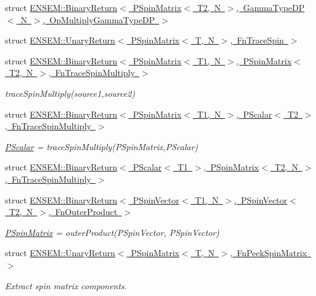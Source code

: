 \begin{DoxyCompactItemize}
\item 
struct \mbox{\hyperlink{structENSEM_1_1BinaryReturn_3_01PSpinMatrix_3_01T2_00_01N_01_4_00_01GammaTypeDP_3_01N_01_4_00_01OpMultiplyGammaTypeDP_01_4}{E\+N\+S\+E\+M\+::\+Binary\+Return$<$ P\+Spin\+Matrix$<$ T2, N $>$, Gamma\+Type\+D\+P$<$ N $>$, Op\+Multiply\+Gamma\+Type\+D\+P $>$}}
\item 
struct \mbox{\hyperlink{structENSEM_1_1UnaryReturn_3_01PSpinMatrix_3_01T_00_01N_01_4_00_01FnTraceSpin_01_4}{E\+N\+S\+E\+M\+::\+Unary\+Return$<$ P\+Spin\+Matrix$<$ T, N $>$, Fn\+Trace\+Spin $>$}}
\item 
struct \mbox{\hyperlink{structENSEM_1_1BinaryReturn_3_01PSpinMatrix_3_01T1_00_01N_01_4_00_01PSpinMatrix_3_01T2_00_01N_01fe1ad0c4fbb2ea3b6d703682cfed6045}{E\+N\+S\+E\+M\+::\+Binary\+Return$<$ P\+Spin\+Matrix$<$ T1, N $>$, P\+Spin\+Matrix$<$ T2, N $>$, Fn\+Trace\+Spin\+Multiply $>$}}
\begin{DoxyCompactList}\small\item\em trace\+Spin\+Multiply(source1,source2) \end{DoxyCompactList}\item 
struct \mbox{\hyperlink{structENSEM_1_1BinaryReturn_3_01PSpinMatrix_3_01T1_00_01N_01_4_00_01PScalar_3_01T2_01_4_00_01FnTraceSpinMultiply_01_4}{E\+N\+S\+E\+M\+::\+Binary\+Return$<$ P\+Spin\+Matrix$<$ T1, N $>$, P\+Scalar$<$ T2 $>$, Fn\+Trace\+Spin\+Multiply $>$}}
\begin{DoxyCompactList}\small\item\em \mbox{\hyperlink{classENSEM_1_1PScalar}{P\+Scalar}} = trace\+Spin\+Multiply(\+P\+Spin\+Matrix,\+P\+Scalar) \end{DoxyCompactList}\item 
struct \mbox{\hyperlink{structENSEM_1_1BinaryReturn_3_01PScalar_3_01T1_01_4_00_01PSpinMatrix_3_01T2_00_01N_01_4_00_01FnTraceSpinMultiply_01_4}{E\+N\+S\+E\+M\+::\+Binary\+Return$<$ P\+Scalar$<$ T1 $>$, P\+Spin\+Matrix$<$ T2, N $>$, Fn\+Trace\+Spin\+Multiply $>$}}
\item 
struct \mbox{\hyperlink{structENSEM_1_1BinaryReturn_3_01PSpinVector_3_01T1_00_01N_01_4_00_01PSpinVector_3_01T2_00_01N_01_4_00_01FnOuterProduct_01_4}{E\+N\+S\+E\+M\+::\+Binary\+Return$<$ P\+Spin\+Vector$<$ T1, N $>$, P\+Spin\+Vector$<$ T2, N $>$, Fn\+Outer\+Product $>$}}
\begin{DoxyCompactList}\small\item\em \mbox{\hyperlink{classENSEM_1_1PSpinMatrix}{P\+Spin\+Matrix}} = outer\+Product(\+P\+Spin\+Vector, P\+Spin\+Vector) \end{DoxyCompactList}\item 
struct \mbox{\hyperlink{structENSEM_1_1UnaryReturn_3_01PSpinMatrix_3_01T_00_01N_01_4_00_01FnPeekSpinMatrix_01_4}{E\+N\+S\+E\+M\+::\+Unary\+Return$<$ P\+Spin\+Matrix$<$ T, N $>$, Fn\+Peek\+Spin\+Matrix $>$}}
\begin{DoxyCompactList}\small\item\em Extract spin matrix components. \end{DoxyCompactList}\end{DoxyCompactItemize}
